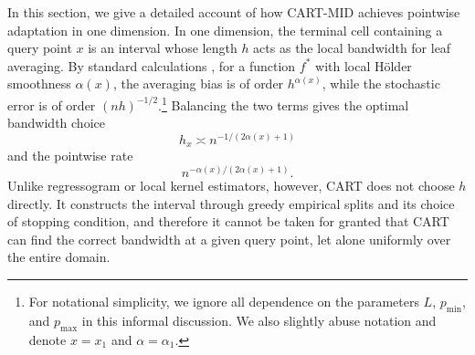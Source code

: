\documentclass[11pt]{article}
\theoremstyle{plain}
\theoremstyle{definition}
\theoremstyle{remark}
\theoremstyle{plain}
\newcommand{\1}{\mathbbm{1}}
\begin{document}
In this section, we give a detailed account of how CART-MID achieves pointwise adaptation in one dimension.
In one dimension, the terminal cell containing a query point $x$ is an interval whose length $h$ acts as the local bandwidth for leaf averaging.
By standard calculations \citep{tsybakov2008introduction}, for a function $f^*$ with local H\"older smoothness $\alpha(x)$, the averaging bias is of order $h^{\alpha(x)}$, while the stochastic error is of order $(nh)^{-1/2}$.\footnote{For notational simplicity, we ignore all dependence on the parameters $L$, $p_{\min}$, and $p_{\max}$ in this informal discussion. We also slightly abuse notation and denote $x=x_1$ and $\alpha = \alpha_1$.} Balancing the two terms gives the optimal bandwidth choice
\[
h_x\asymp n^{-1/(2\alpha(x)+1)}
\]
and the pointwise rate
\[
n^{-\alpha(x)/(2\alpha(x)+1)}.
\]
Unlike regressogram or local kernel estimators, however, CART does not choose $h$ directly. It constructs the interval through greedy empirical splits and its choice of stopping condition, and therefore it cannot be taken for granted that CART can find the correct bandwidth at a given query point, let alone uniformly over the entire domain.
\end{document}
